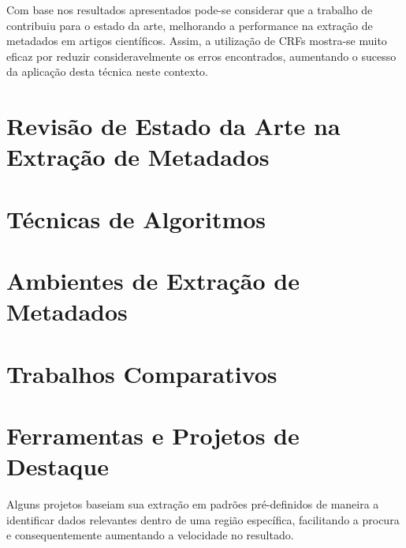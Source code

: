 \begin{textedited}
Com base nos resultados apresentados pode-se considerar que a trabalho de \cite{Peng-CRF-IE} contribuiu para o estado da arte, melhorando a performance na extração de metadados em artigos científicos. Assim, a utilização de CRFs mostra-se muito eficaz por reduzir consideravelmente os erros encontrados, aumentando o sucesso da aplicação desta técnica neste contexto.
\end{textedited}












\section{Revisão de Estado da Arte na Extração de Metadados}
\label{sec:revision}

\section{Técnicas de Algoritmos}
\label{sec:algorithms-tecniques}

\section{Ambientes de Extração de Metadados}
\label{sec:environments}












\section{Trabalhos Comparativos}
\label{sec:comparatives-works}


\section{Ferramentas e Projetos de Destaque}
\label{sec:tools}

Alguns projetos baseiam sua extração em padrões pré-definidos de maneira a identificar dados relevantes dentro de uma região específica, facilitando a procura e consequentemente aumentando a velocidade no resultado. 

